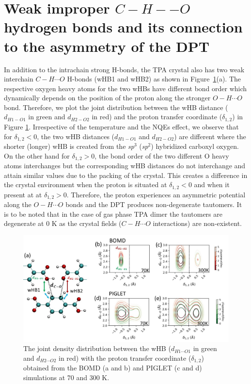 \section{Weak improper \texorpdfstring{$C-H--O$}{} hydrogen bonds and its connection to the asymmetry of the DPT} \label{whb-td}

In addition to the intrachain strong H-bonds, the TPA crystal also has two weak interchain  $C-H\cdots O$ H-bonds (wHB1 and wHB2) as shown in Figure~\ref{fig:cip12}(a). The respective oxygen heavy atoms for the two wHBs have different bond order which dynamically depends on the position of the proton along the stronger $O-H\cdots O$ bond. Therefore, we plot the joint distribution between the wHB distance ($d_{H1-O1}$ in green and $d_{H2-O2}$ in red) and the proton transfer coordinate ($\delta_{1,2}$) in Figure \ref{fig:cip12}. Irrespective of the temperature and the NQEs effect, we observe that for $\delta_{1,2} < 0$, the two wHB distances ($d_{H1-O1}$ and $d_{H2-O2}$) are different where the shorter (longer) wHB is created from the \textit{sp$^3$} (\textit{sp$^2$}) hybridized carboxyl oxygen. On the other hand for $\delta_{1,2} > 0$, the bond order of the two different O heavy atoms interchanges but the corresponding wHB distances do not interchange and attain similar values due to the packing of the crystal. This creates a difference in the crystal environment when the proton is situated at $\delta_{1,2} < 0$ and when it present at at $\delta_{1,2} > 0$. Therefore, the proton experiences an asymmetric potential along the  $O-H\cdots O$ bonds and the DPT produces non-degenerate tautomers. It is to be noted that in the case of gas phase TPA dimer the tautomers are degenerate at 0 K as the crystal fields ($C-H\cdots O$ interactions) are non-existent. 

\begin{figure}
\centering
\includegraphics[width=15cm ]{./Appendix4/new_figures_si/figure12.jpg}
\caption{The joint density distribution between the wHB ($d_{H1\cdots O1}$ in green and $d_{H2\cdots O2}$ in red) with the proton transfer coordinate ($\delta_{1,2}$) obtained from the BOMD (a and b) and PIGLET (c and d) simulations at 70 and 300 K.}
\label{fig:cip12}
\end{figure}

